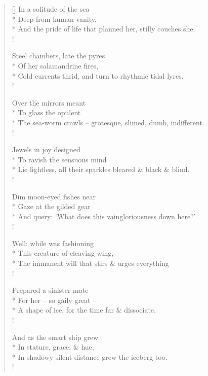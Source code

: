 \documentclass[MAIN]{subfiles}
\begin{document}
\settowidth{\versewidth}{And the pride of life that planned her, stilly couches she.}
\begin{verse}[\versewidth]
\vin \vin In a solitude of the sea\\*
\vin \vin Deep from human vanity,\\*
And the pride of life that planned her, stilly couches she.\\!

\vin \vin Steel chambers, late the pyres\\*
\vin \vin Of her salamandrine fires,\\*
Cold currents thrid, and turn to rhythmic tidal lyres.\\!

\vin \vin Over the mirrors meant\\*
\vin \vin To glass the opulent\\*
The sea-worm crawls -- grotesque, slimed, dumb, indifferent.\\!

\vin \vin Jewels in joy designed\\*
\vin \vin To ravish the sensuous mind\\*
Lie lightless, all their sparkles bleared \& black \& blind.\\!

\vin \vin Dim moon-eyed fishes near\\*
\vin \vin Gaze at the gilded gear\\*
And query: `What does this vaingloriousness down here?'\\!

\vin \vin Well: while was fashioning\\*
\vin \vin This creature of cleaving wing,\\*
The immanent will that stirs \& urges everything\\!

\vin \vin Prepared a sinister mate\\*
\vin \vin For her -- so gaily great --\\*
A shape of ice, for the time far \& dissociate.\\!

\vin \vin And as the smart ship grew\\*
\vin \vin In stature, grace, \& hue,\\*
In shadowy silent distance grew the iceberg too.\\!


\end{verse}
\end{document}
